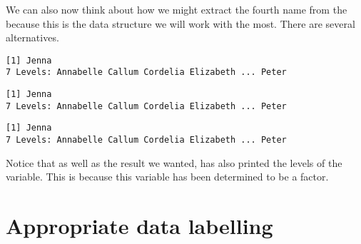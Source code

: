 We can also now think about how we might extract the fourth name from the  because this is the data structure we will work with the most. There are several alternatives. 
\begin{knitrout}
\color{fgcolor}\begin{kframe}
\begin{alltt}
\hlstd{> }\hlstd{MyFirstDF[}\hlstd{,}\hlstd{]}
\end{alltt}
\begin{verbatim}
[1] Jenna
7 Levels: Annabelle Callum Cordelia Elizabeth ... Peter
\end{verbatim}
\begin{alltt}
\hlstd{> }\hlstd{MyFirstDF[}\hlstd{,}\hlstd{]}
\end{alltt}
\begin{verbatim}
[1] Jenna
7 Levels: Annabelle Callum Cordelia Elizabeth ... Peter
\end{verbatim}
\begin{alltt}
\hlstd{> }\hlopt{$}\hlstd{Names[}\hlstd{]}
\end{alltt}
\begin{verbatim}
[1] Jenna
7 Levels: Annabelle Callum Cordelia Elizabeth ... Peter
\end{verbatim}
\end{kframe}
\end{knitrout}
 
Notice that as well as the result we wanted, \R{} has also printed the levels of the  variable. This is because this variable has been determined to be a factor. 
 
 
 
\section{Appropriate data labelling} 
 

